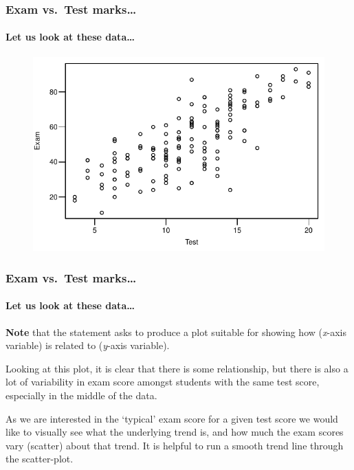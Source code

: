 \documentclass{beamer}\usepackage[]{graphicx}\usepackage[]{xcolor}
\begin{document}
\begin{frame}[fragile]
\frametitle{Exam vs.\ Test marks\ldots}
\framesubtitle{Let us look at these data\ldots}



\begin{figure}
  \centering
  \includegraphics{figure/RC-H01-010}
\end{figure}

\end{frame}


\begin{frame}[fragile]
\frametitle{Exam vs.\ Test marks\ldots}
\framesubtitle{Let us look at these data\ldots}

{\bf Note} that the  statement
asks  to produce a plot suitable for showing how   ({\it x}-axis variable)
is related to  ({\it y}-axis variable).

Looking at this plot, it is clear that there is some relationship,
but there is also a lot of variability in exam score amongst students with the same
test score, especially in the middle of the data.

\medskip As we are interested in the `typical' exam score 
for a given test score we would like to visually see
what the underlying trend is,
and how much the exam scores vary (scatter) about that trend.
It is helpful to run a smooth trend line through the scatter-plot.

\end{frame}
\end{document}
